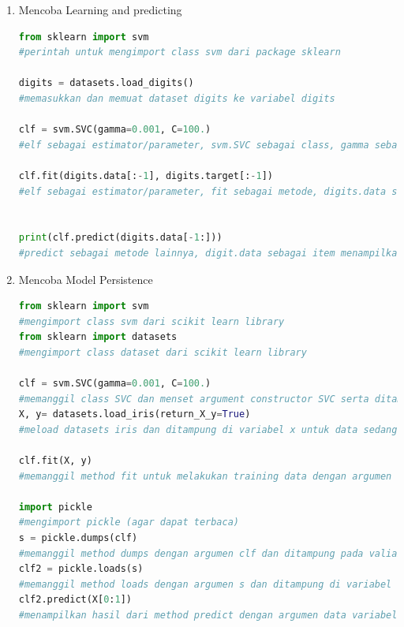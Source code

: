 \begin{enumerate}
\begin{lstlisting}[language=Python]
print(digits.data) 
#memberikan akses ke fitur yang dapat digunakan untuk mengklasifikasikan  sampel digit dan menampilkan diconsole

digits.target 
#memberikan informasi tentang data yang berhubungan atau juga dapat dijadikan sebagai label

digits.images[0] 
#Data selalu berupa array 2D, shape (n.samples, n.features), meskipun data aslinya mungkin memiliki bentuk yang berbeda.
\end{lstlisting}
\item Mencoba Learning and predicting
\begin{lstlisting}[language=Python]
from sklearn import svm 
#perintah untuk mengimport class svm dari package sklearn

digits = datasets.load_digits()    
#memasukkan dan memuat dataset digits ke variabel digits

clf = svm.SVC(gamma=0.001, C=100.) 
#elf sebagai estimator/parameter, svm.SVC sebagai class, gamma sebagai parameter untuk menerapkan nilai secara manual

clf.fit(digits.data[:-1], digits.target[:-1]) 
#elf sebagai estimator/parameter, fit sebagai metode, digits.data sebagai item,[:-1] sebagai syntax python dan menampilkan outputnya


print(clf.predict(digits.data[-1:])) 
#predict sebagai metode lainnya, digit.data sebagai item menampilkan outputnya
\end{lstlisting}
\item Mencoba Model Persistence
\begin{lstlisting}[language=Python]
from sklearn import svm 
#mengimport class svm dari scikit learn library
from sklearn import datasets 
#mengimport class dataset dari scikit learn library
 
clf = svm.SVC(gamma=0.001, C=100.) 
#memanggil class SVC dan menset argument constructor SVC serta ditampung di variabel clf
X, y= datasets.load_iris(return_X_y=True) 
#meload datasets iris dan ditampung di variabel x untuk data sedangkan y untuk target

clf.fit(X, y) 
#memanggil method fit untuk melakukan training data dengan argumen data dan target dari database iris 

import pickle 
#mengimport pickle (agar dapat terbaca)
s = pickle.dumps(clf) 
#memanggil method dumps dengan argumen clf dan ditampung pada valiabel s
clf2 = pickle.loads(s) 
#memanggil method loads dengan argumen s dan ditampung di variabel clf2
clf2.predict(X[0:1]) 
#menampilkan hasil dari method predict dengan argumen data variabel x 


\end{lstlisting}
\end{enumerate}
